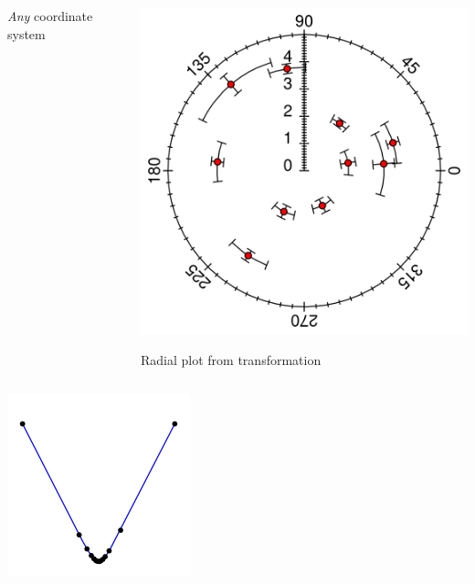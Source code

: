 \documentclass[compress]{beamer}
\begin{document}
\begin{frame}
\begin{columns}
\begin{center}
{\it Any} coordinate system
\end{center}

\begin{center}
\includegraphics[width=\linewidth]{ExampleRadialPlot.png}

Radial plot from transformation
\end{center}
\end{columns}

\begin{columns}
\begin{center}
\includegraphics[width=\linewidth]{introduction-8.png}


\end{center}
\end{columns}
\end{frame}
\end{document}
